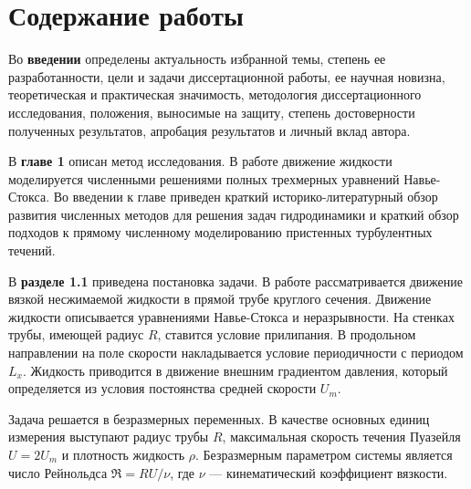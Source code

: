 \section*{\centering Содержание работы}

Во \textbf{введении} определены актуальность избранной темы, степень ее разработанности, цели и задачи диссертационной работы, ее научная новизна, теоретическая и практическая значимость, методология диссертационного исследования, положения, выносимые на защиту, степень достоверности полученных результатов, апробация результатов и личный вклад автора. 

В {\bf главе 1} описан метод исследования. В работе движение жидкости моделируется численными решениями полных трехмерных уравнений Навье-Стокса. 
Во введении к главе приведен краткий историко-литературный обзор развития численных методов для решения задач гидродинамики и краткий обзор подходов к прямому численному моделированию пристенных турбулентных течений. 

В \textbf{разделе 1.1} приведена постановка задачи. В работе рассматривается движение вязкой несжимаемой жидкости в прямой трубе круглого сечения. Движение жидкости описывается уравнениями Навье-Стокса и неразрывности.
На стенках трубы, имеющей радиус $R$, ставится условие прилипания. В продольном направлении на поле скорости накладывается условие периодичности с периодом $L_x$. Жидкость приводится в движение внешним градиентом давления, который определяется из условия постоянства средней скорости $U_m$. 

Задача решается в безразмерных переменных. В качестве основных единиц измерения выступают радиус трубы $R$, максимальная скорость течения Пуазейля $U = 2U_m$ и плотность жидкость $\rho$. Безразмерным параметром системы является число Рейнольдса $ \Re = {R U}/{\nu}$, где $\nu$ --- кинематический коэффициент вязкости.

